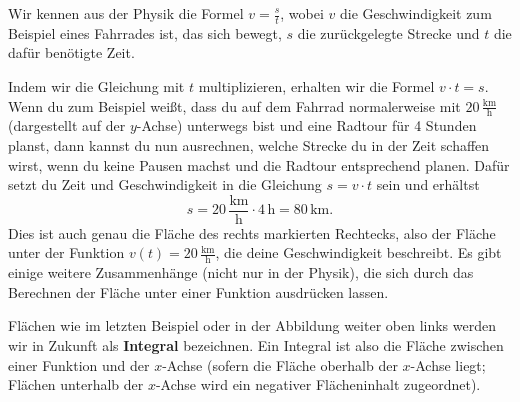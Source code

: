 \documentclass[../../main.tex]{subfiles}
\begin{document}
\begin{example}{}
    Wir kennen aus der Physik die Formel $v=\frac{s}{t}$, wobei $v$ die Geschwindigkeit zum Beispiel eines Fahrrades ist,
    das sich bewegt, $s$ die zurückgelegte Strecke und $t$ die dafür benötigte Zeit.

    Indem wir die Gleichung mit $t$ multiplizieren, erhalten wir die Formel $v\cdot t=s$. Wenn du zum Beispiel weißt, 
    dass du auf dem Fahrrad normalerweise mit $20\,\frac{\text{km}}{\text{h}}$ (dargestellt auf der $y$-Achse) unterwegs 
    bist und eine Radtour für 4 Stunden planst, dann kannst du nun ausrechnen, welche Strecke du in der Zeit schaffen
    wirst, wenn du keine Pausen machst und die Radtour entsprechend planen. Dafür setzt du Zeit und Geschwindigkeit in
    die Gleichung $s=v\cdot t$ sein und erhältst
    \[s=20\,\frac{\text{km}}{\text{h}}\cdot 4\,\text{h}=80\,\text{km}.\]
    Dies ist auch genau die Fläche des rechts markierten Rechtecks, also der Fläche unter der Funktion 
    $v(t)=20\,\frac{\text{km}}{\text{h}}$, die deine Geschwindigkeit beschreibt. Es gibt einige weitere Zusammenhänge
    (nicht nur in der Physik), die sich durch das Berechnen der Fläche unter einer Funktion ausdrücken lassen.
\end{example}
Flächen wie im letzten Beispiel oder in der Abbildung weiter oben links werden wir in Zukunft als \textbf{Integral} 
bezeichnen. Ein Integral ist also die Fläche zwischen einer Funktion und der $x$-Achse (sofern die Fläche oberhalb der 
$x$-Achse liegt; Flächen unterhalb der $x$-Achse wird ein negativer Flächeninhalt zugeordnet).
\end{document}
